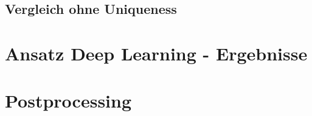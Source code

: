 \subsection{Vergleich ohne Uniqueness}

\section{Ansatz Deep Learning - Ergebnisse}

\section{Postprocessing}



